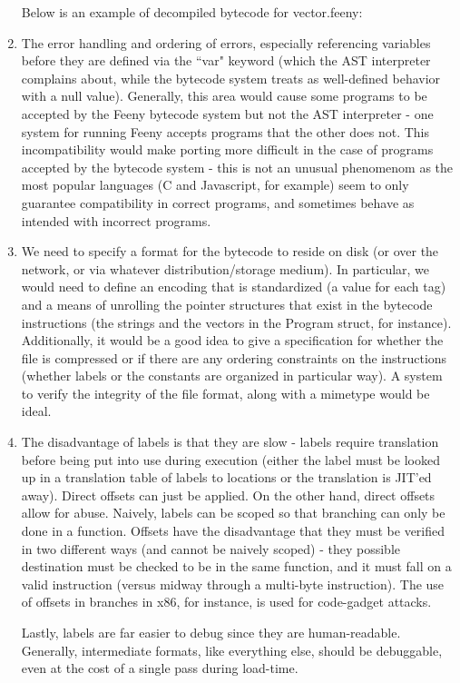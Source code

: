 \documentclass[notitlepage]{report}
\begin{document}
\begin{enumerate}
		Below is an example of decompiled bytecode for vector.feeny:
		{\scriptsize
		
		}
	\item %
		The error handling and ordering of errors, especially referencing variables before they are defined via the ``var" keyword (which the AST interpreter complains about, while the bytecode system treats as well-defined behavior with a null value).  Generally, this area would cause some programs to be accepted by the Feeny bytecode system but not the AST interpreter - one system for running Feeny accepts programs that the other does not.  This incompatibility would make porting more difficult in the case of programs accepted by the bytecode system - this is not an unusual phenomenom as the most popular languages (C and Javascript, for example) seem to only guarantee compatibility in correct programs, and sometimes behave as intended with incorrect programs.
	\item We need to specify a format for the bytecode to reside on disk (or over the network, or via whatever distribution/storage medium).  In particular, we would need to define an encoding that is standardized (a value for each tag) and a means of unrolling the pointer structures that exist in the bytecode instructions (the strings and the vectors in the Program struct, for instance).  Additionally, it would be a good idea to give a specification for whether the file is compressed or if there are any ordering constraints on the instructions (whether labels or the constants are organized in particular way).  A system to verify the integrity of the file format, along with a mimetype would be ideal.
	\item The disadvantage of labels is that they are slow - labels require translation before being put into use during execution (either the label must be looked up in a translation table of labels to locations or the translation is JIT'ed away).  Direct offsets can just be applied.  On the other hand, direct offsets allow for abuse.  Naively, labels can be scoped so that branching can only be done in a function.  Offsets have the disadvantage that they must be verified in two different ways (and cannot be naively scoped) - they possible destination must be checked to be in the same function, and it must fall on a valid instruction (versus midway through a multi-byte instruction).  The use of offsets in branches in x86, for instance, is used for code-gadget attacks.

		Lastly, labels are far easier to debug since they are human-readable.  Generally, intermediate formats, like everything else, should be debuggable, even at the cost of a single pass during load-time.
\end{enumerate}
\end{document}
